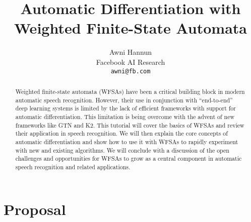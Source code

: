 \documentclass[11pt]{article}
\title{Automatic Differentiation with Weighted Finite-State Automata}
\author{
  Awni Hannun\\
  Facebook AI Research \\
  \texttt{awni@fb.com}
}
\begin{document}
\maketitle

\begin{abstract}
  Weighted finite-state automata (WFSAs) have been a critical building block in
  modern automatic speech recognition. However, their use in conjunction with
  ``end-to-end'' deep learning systems is limited by the lack of efficient
  frameworks with support for automatic differentiation. This limitation is
  being overcome with the advent of new frameworks like GTN and K2. This
  tutorial will cover the basics of WFSAs and review their application in
  speech recognition. We will then explain the core concepts of automatic
  differentiation and show how to use it with WFSAs to rapidly experiment with
  new and existing algorithms. We will conclude with a discussion of the open
  challenges and opportunities for WFSAs to grow as a central component in
  automatic speech recognition and related applications.
\end{abstract}

\section*{Proposal}
\end{document}
